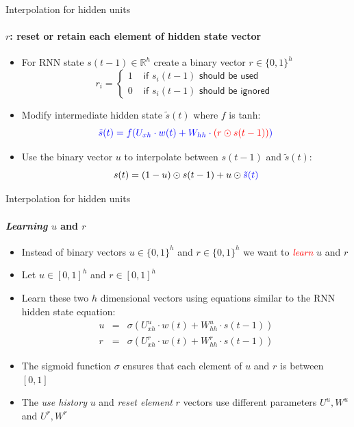 \begin{frame}{Interpolation for hidden units}
\framesubtitle{$r$: reset or retain each element of hidden state vector}
\begin{itemize}[<+->]
	\item For RNN state $s(t-1) \in \mathbb{R}^h$ create a binary vector $r \in \{0,1\}^h$
	\[ r_i = \left\{ \begin{array}{cl}
		1 & \textsf{ if $s_i(t-1)$ should be used }\\
		0 & \textsf{ if $s_i(t-1)$ should be ignored }
	\end{array} \right. \]
	\item Modify intermediate hidden state $\tilde{s}(t)$ where $f$ is tanh: 
	\[ \textcolor{blue}{\tilde{s}(t) = f(U_{xh} \cdot w(t) + W_{hh} \cdot \textcolor{red}{\left( r \odot s(t-1) \right)})} \]
	\item Use the binary vector $u$ to interpolate between $s(t-1)$ and $\tilde{s}(t)$:
	\[ s(t) = (1-u) \odot s(t-1) + u \odot \textcolor{blue}{\tilde{s}(t)} \]
\end{itemize}
\end{frame}

\begin{frame}{Interpolation for hidden units}
\framesubtitle{{\it Learning} $u$ and $r$}
\begin{itemize}[<+->]
	\item Instead of binary vectors $u \in \{0,1\}^h$ and $r \in \{0,1\}^h$ we want to \textcolor{red}{{\em learn}} $u$ and $r$
	\item Let $u \in [0,1]^h$ and $r \in [0,1]^h$
	\item Learn these two $h$ dimensional vectors using equations similar to the RNN hidden state equation:
	\begin{eqnarray*}
		u &=& \sigma\left( U^u_{xh} \cdot w(t) + W^u_{hh} \cdot s(t-1) \right)  \\
		r &=& \sigma\left( U^r_{xh} \cdot w(t) + W^r_{hh} \cdot s(t-1) \right)
	\end{eqnarray*}
	\item The sigmoid function $\sigma$ ensures that each element of $u$ and $r$ is between $[0,1]$
	\item The {\it use history} $u$ and {\it reset element} $r$ vectors use different parameters $U^u, W^u$ and $U^r, W^r$
\end{itemize}
\end{frame}

